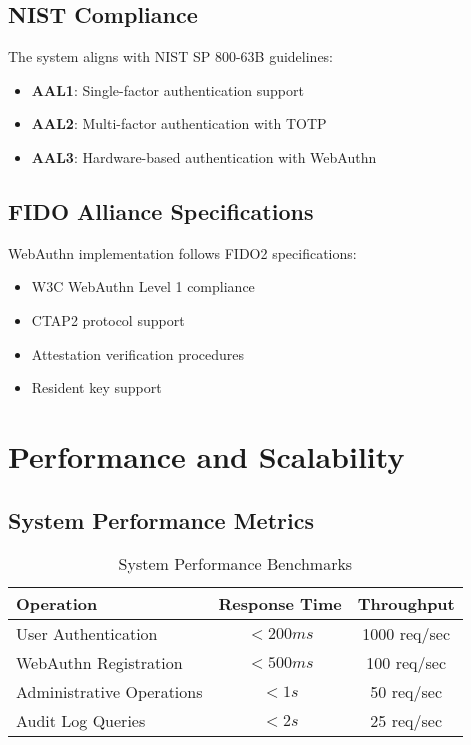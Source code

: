 \documentclass[12pt,a4paper]{article}
\begin{document}
\subsection{NIST Compliance}
The system aligns with NIST SP 800-63B guidelines:

\begin{itemize}
    \item \textbf{AAL1}: Single-factor authentication support
    \item \textbf{AAL2}: Multi-factor authentication with TOTP
    \item \textbf{AAL3}: Hardware-based authentication with WebAuthn
\end{itemize}

\subsection{FIDO Alliance Specifications}
WebAuthn implementation follows FIDO2 specifications:
\begin{itemize}
    \item W3C WebAuthn Level 1 compliance
    \item CTAP2 protocol support
    \item Attestation verification procedures
    \item Resident key support
\end{itemize}

\section{Performance and Scalability}

\subsection{System Performance Metrics}
\begin{table}[H]
\centering
\begin{tabular}{|l|c|c|}
\hline
\textbf{Operation} & \textbf{Response Time} & \textbf{Throughput} \\
\hline
User Authentication & $< 200ms$ & 1000 req/sec \\
\hline
WebAuthn Registration & $< 500ms$ & 100 req/sec \\
\hline
Administrative Operations & $< 1s$ & 50 req/sec \\
\hline
Audit Log Queries & $< 2s$ & 25 req/sec \\
\hline
\end{tabular}
\caption{System Performance Benchmarks}
\label{tab:performance}
\end{table}
\end{document}
